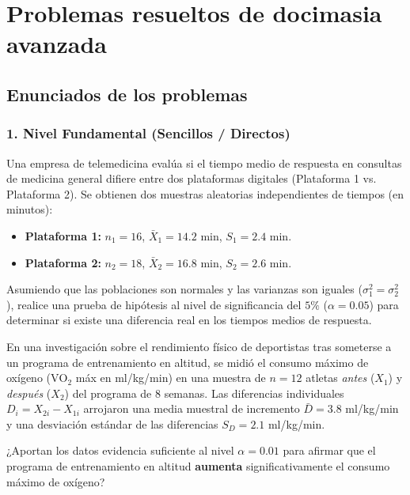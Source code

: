 \section{Problemas resueltos de docimasia avanzada}

\subsection{Enunciados de los problemas}

\subsubsection*{1. Nivel Fundamental (Sencillos / Directos)}

\begin{problema}
	\label{prob:doc_dos_medias_iguales}
	Una empresa de telemedicina evalúa si el tiempo medio de respuesta en consultas de medicina general difiere entre dos plataformas digitales (Plataforma 1 vs. Plataforma 2). Se obtienen dos muestras aleatorias independientes de tiempos (en minutos):
	\begin{itemize}
		\item \textbf{Plataforma 1:} $n_1 = 16$, $\bar{X}_1 = 14.2$ min, $S_1 = 2.4$ min.
		\item \textbf{Plataforma 2:} $n_2 = 18$, $\bar{X}_2 = 16.8$ min, $S_2 = 2.6$ min.
	\end{itemize}
	Asumiendo que las poblaciones son normales y las varianzas son iguales ($\sigma_1^2 = \sigma_2^2$), realice una prueba de hipótesis al nivel de significancia del $5\%$ ($\alpha = 0.05$) para determinar si existe una diferencia real en los tiempos medios de respuesta.
\end{problema}

\begin{problema}
	\label{prob:doc_pareadas}
	En una investigación sobre el rendimiento físico de deportistas tras someterse a un programa de entrenamiento en altitud, se midió el consumo máximo de oxígeno ($\text{VO}_2$ máx en ml/kg/min) en una muestra de $n = 12$ atletas \emph{antes} ($X_1$) y \emph{después} ($X_2$) del programa de 8 semanas. Las diferencias individuales $D_i = X_{2i} - X_{1i}$ arrojaron una media muestral de incremento $\bar{D} = 3.8$ ml/kg/min y una desviación estándar de las diferencias $S_D = 2.1$ ml/kg/min.
	
	¿Aportan los datos evidencia suficiente al nivel $\alpha = 0.01$ para afirmar que el programa de entrenamiento en altitud \textbf{aumenta} significativamente el consumo máximo de oxígeno?
\end{problema}

